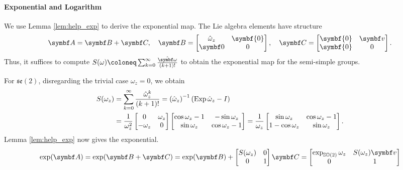 \paragraph{Exponential and Logarithm}

We use Lemma \ref{lem:help_exp} to derive the exponential map. The Lie algebra elements have structure
\begin{equation}
  \A = \B + \C, \quad \B = \begin{bmatrix} \hat \omega_{z} & \symbf{0} \\ \symbf 0 & 0 \end{bmatrix}, \quad \C = \begin{bmatrix} \symbf{0} & \bv \\ \symbf{0} & 0 \end{bmatrix}.
\end{equation}
Thus, it suffices to compute $S(\omega) \coloneq \sum_{k = 0}^\infty \frac{\hat \bomega}{(k+1)!}$ to obtain the exponential map for the semi-simple groups.

For $\mathfrak{se}(2)$, disregarding the trivial case $\omega_{z} = 0$, we obtain
\begin{equation}
  \begin{aligned}
    S(\omega_z)
     & = \sum_{k = 0}^\infty \frac{\hat \omega_z^k}{(k+1)!} = \left( \hat \omega_z \right)^{-1} \left( \operatorname{Exp} \hat \omega_z - I \right) \\
     & = \frac{1}{\omega_z^2} \begin{bmatrix}
      0 & \omega_z \\ -\omega_z & 0
    \end{bmatrix} \begin{bmatrix}
      \cos \omega_z - 1 & -\sin \omega_z \\ \sin \omega_z & \cos \omega_z - 1
    \end{bmatrix} =  \frac{1}{\omega_z}\begin{bmatrix}
      \sin \omega_z     & \cos \omega_z - 1 \\
      1 - \cos \omega_z & \sin \omega_z
    \end{bmatrix}.
  \end{aligned}
\end{equation}
Lemma \ref{lem:help_exp} now gives the exponential.
\begin{equation}
  \label{eq:6}
  \exp(\A) = \exp(\B + \C) = \exp(\B) + \begin{bmatrix} S(\omega_{z}) & 0 \\ 0 & 1 \end{bmatrix} \C = \begin{bmatrix} \exp_{\SOtwo} \omega_{z} & S(\omega_{z}) \bv \\ 0 & 1 \end{bmatrix}
\end{equation}


